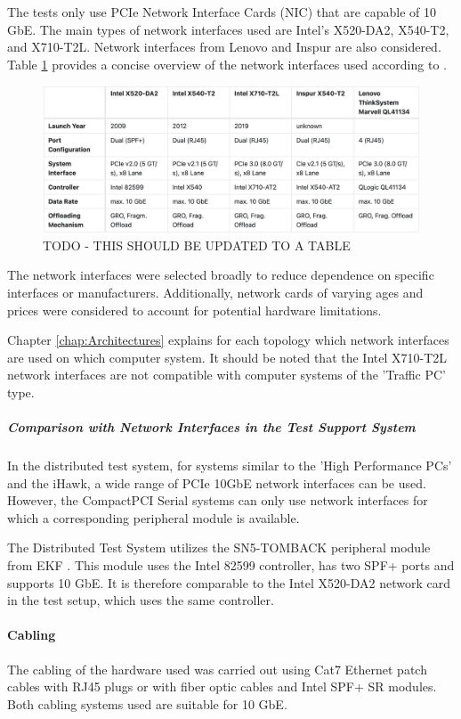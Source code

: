 The tests only use PCIe Network Interface Cards (NIC) that are capable of 10 GbE. The main types of network interfaces used are Intel's X520-DA2, X540-T2, and X710-T2L. Network interfaces from Lenovo and Inspur are also considered. Table \ref{tab:NWHardware} provides a concise overview of the network interfaces used according to \cite{setupnw01, setupnw02, setupnw03, setupnw04}.

\begin{figure}[h]
    \centering
    \includegraphics[width=1\linewidth]{figures/method/temp1.png}
    \caption{TODO - THIS SHOULD BE UPDATED TO A TABLE}
    \label{tab:NWHardware}
\end{figure}

The network interfaces were selected broadly to reduce dependence on specific interfaces or manufacturers. Additionally, network cards of varying ages and prices were considered to account for potential hardware limitations.

Chapter \ref{chap:Architectures} explains for each topology which network interfaces are used on which computer system. It should be noted that the Intel X710-T2L network interfaces are not compatible with computer systems of the 'Traffic PC' type.


\subparagraph{Comparison with Network Interfaces in the Test Support System}

In the distributed test system, for systems similar to the 'High Performance PCs' and the iHawk, a wide range of PCIe 10GbE network interfaces can be used. However, the CompactPCI Serial systems can only use network interfaces for which a corresponding peripheral module is available.

The Distributed Test System utilizes the SN5-TOMBACK peripheral module from EKF \cite{setupnw05}. This module uses the Intel 82599 controller, has two SPF+ ports and supports 10 GbE. It is therefore comparable to the Intel X520-DA2 network card in the test setup, which uses the same controller.

\paragraph{Cabling}
The cabling of the hardware used was carried out using Cat7 Ethernet patch cables with RJ45 plugs or with fiber optic cables and Intel SPF+ SR modules. Both cabling systems used are suitable for 10 GbE.

